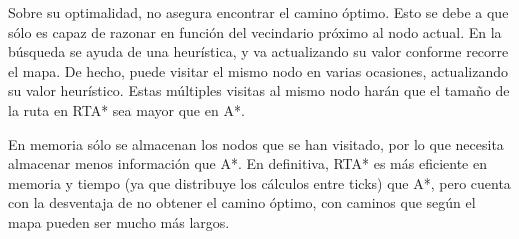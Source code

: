 \documentclass[12pt]{article} %
\begin{document}
Sobre su optimalidad, no asegura encontrar el camino óptimo. Esto se debe a que sólo es capaz de razonar en función del vecindario próximo al nodo actual. En la búsqueda se ayuda de una heurística, y va actualizando su valor conforme recorre el mapa. De hecho, puede visitar el mismo nodo en varias ocasiones, actualizando su valor heurístico. Estas múltiples visitas al mismo nodo harán que el tamaño de la ruta en RTA* sea mayor que en A*. 

En memoria sólo se almacenan los nodos que se han visitado, por lo que necesita almacenar menos información que A*. En definitiva, RTA* es más eficiente en memoria y tiempo (ya que distribuye los cálculos entre ticks) que A*, pero cuenta con la desventaja de no obtener el camino óptimo, con caminos que según el mapa pueden ser mucho más largos.
\end{document}

